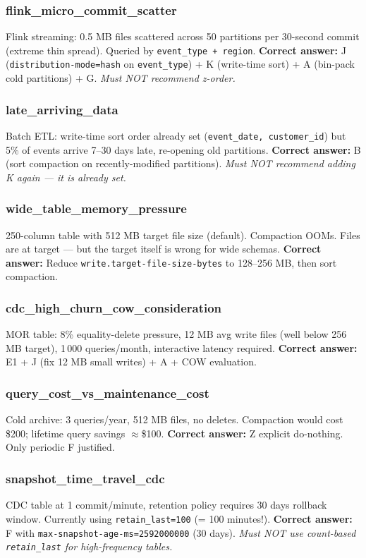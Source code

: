 \documentclass[11pt,a4paper]{article}
\newcommand{\code}[1]{\texttt{#1}}
\begin{document}
\subsubsection{flink\_micro\_commit\_scatter}
Flink streaming: 0.5 MB files scattered across 50 partitions per 30-second
commit (extreme thin spread).  Queried by \code{event\_type + region}.
\textbf{Correct answer:} J (\code{distribution-mode=hash} on \code{event\_type})
+ K (write-time sort) + A (bin-pack cold partitions) + G.
\emph{Must NOT recommend z-order.}

\subsubsection{late\_arriving\_data}
Batch ETL: write-time sort order already set (\code{event\_date, customer\_id})
but 5\% of events arrive 7--30 days late, re-opening old partitions.
\textbf{Correct answer:} B (sort compaction on recently-modified partitions).
\emph{Must NOT recommend adding K again --- it is already set.}

\subsubsection{wide\_table\_memory\_pressure}
250-column table with 512 MB target file size (default).  Compaction OOMs.
Files are at target --- but the target itself is wrong for wide schemas.
\textbf{Correct answer:} Reduce \code{write.target-file-size-bytes} to
128--256 MB, then sort compaction.

\subsubsection{cdc\_high\_churn\_cow\_consideration}
MOR table: 8\% equality-delete pressure, 12 MB avg write files (well below
256 MB target), 1\,000 queries/month, interactive latency required.
\textbf{Correct answer:} E1 + J (fix 12 MB small writes) + A + COW evaluation.

\subsubsection{query\_cost\_vs\_maintenance\_cost}
Cold archive: 3 queries/year, 512 MB files, no deletes.  Compaction would
cost \$200; lifetime query savings $\approx$\$100.
\textbf{Correct answer:} Z explicit do-nothing.  Only periodic F justified.

\subsubsection{snapshot\_time\_travel\_cdc}
CDC table at 1 commit/minute, retention policy requires 30 days rollback
window.  Currently using \code{retain\_last=100} (= 100 minutes!).
\textbf{Correct answer:} F with \code{max-snapshot-age-ms=2592000000} (30 days).
\emph{Must NOT use count-based \code{retain\_last} for high-frequency tables.}
\end{document}
